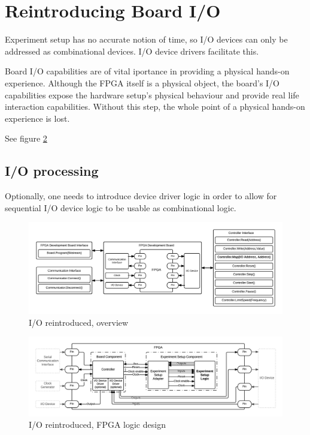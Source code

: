 \documentclass[openright]{uva-bachelor-thesis}
\begin{document}
\section{Reintroducing Board I/O}
\label{sectionreintroducingio}

Experiment setup has no accurate notion of time, so I/O devices can only be addressed as combinational devices. I/O device drivers facilitate this.

Board I/O capabilities are of vital iportance in providing a physical hands-on experience. Although the FPGA itself is a physical object, the board's I/O capabilities expose the hardware setup's physical behaviour and provide real life interaction capabilities. Without this step, the whole point of a physical hands-on experience is lost.

See figure \ref{fig:fpga-io}

\subsection{I/O processing}
Optionally, one needs to introduce device driver logic in order to allow for sequential I/O device logic to be usable as combinational logic. 




\begin{figure}[h]
\centering
\includegraphics[width=\textwidth]{overview-io}
\caption{I/O reintroduced, overview}
\label{fig:overview-io}
\end{figure}


\begin{figure}[h]
\centering
\includegraphics[width=\textwidth]{fpga-io2}
\caption{I/O reintroduced, FPGA logic design}
\label{fig:fpga-io}
\end{figure}
\end{document}
